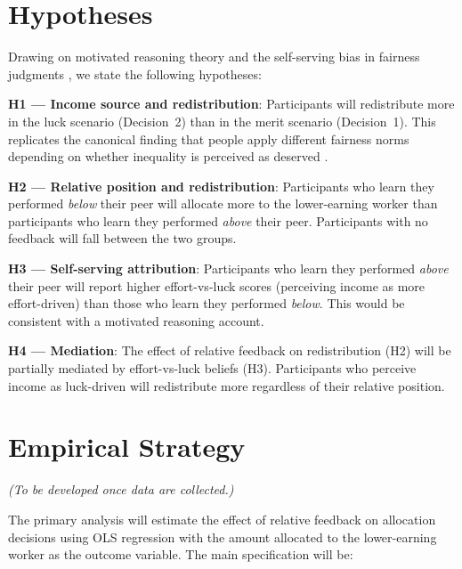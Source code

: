 \documentclass[12pt]{article}
\begin{document}
\section{Hypotheses}
\label{sec:hypotheses}

Drawing on motivated reasoning theory \citep{kunda1990} and the self-serving bias in fairness judgments \citep{konow2000, haisley2010}, we state the following hypotheses:

\textbf{H1 — Income source and redistribution}: Participants will redistribute more in the luck scenario (Decision~2) than in the merit scenario (Decision~1). This replicates the canonical finding that people apply different fairness norms depending on whether inequality is perceived as deserved \citep{cappelen2007, almas2020}.

\textbf{H2 — Relative position and redistribution}: Participants who learn they performed \textit{below} their peer will allocate more to the lower-earning worker than participants who learn they performed \textit{above} their peer. Participants with no feedback will fall between the two groups.

\textbf{H3 — Self-serving attribution}: Participants who learn they performed \textit{above} their peer will report higher effort-vs-luck scores (perceiving income as more effort-driven) than those who learn they performed \textit{below}. This would be consistent with a motivated reasoning account.

\textbf{H4 — Mediation}: The effect of relative feedback on redistribution (H2) will be partially mediated by effort-vs-luck beliefs (H3). Participants who perceive income as luck-driven will redistribute more regardless of their relative position.

\section{Empirical Strategy}
\label{sec:empirics}

\textit{(To be developed once data are collected.)}

The primary analysis will estimate the effect of relative feedback on allocation decisions using OLS regression with the amount allocated to the lower-earning worker as the outcome variable. The main specification will be:
\end{document}
